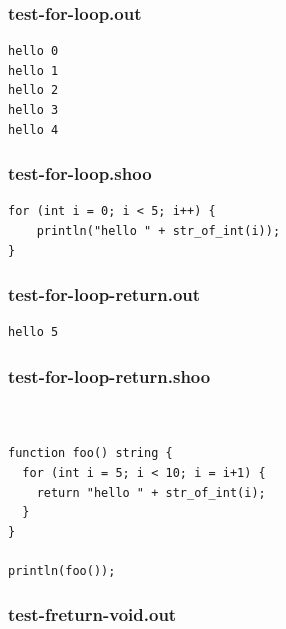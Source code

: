 \documentclass[12pt]{article}
\begin{document}
\subsubsection{test-for-loop.out}
\begin{mdframed}[hidealllines=true,backgroundcolor=green!10]
\begin{lstlisting}
hello 0
hello 1
hello 2
hello 3
hello 4
\end{lstlisting}
\end{mdframed}
\subsubsection{test-for-loop.shoo}
\begin{mdframed}[hidealllines=true,backgroundcolor=blue!10]
\begin{lstlisting}
for (int i = 0; i < 5; i++) {
    println("hello " + str_of_int(i));
}
\end{lstlisting}
\end{mdframed}
\subsubsection{test-for-loop-return.out}
\begin{mdframed}[hidealllines=true,backgroundcolor=green!10]
\begin{lstlisting}
hello 5
\end{lstlisting}
\end{mdframed}
\subsubsection{test-for-loop-return.shoo}
\begin{mdframed}[hidealllines=true,backgroundcolor=blue!10]
\begin{lstlisting}


function foo() string {
  for (int i = 5; i < 10; i = i+1) {
    return "hello " + str_of_int(i);
  }
}

println(foo());\end{lstlisting}
\end{mdframed}
\subsubsection{test-freturn-void.out}
\begin{mdframed}[hidealllines=true,backgroundcolor=green!10]
\begin{lstlisting}
\end{lstlisting}
\end{mdframed}
\end{document}
